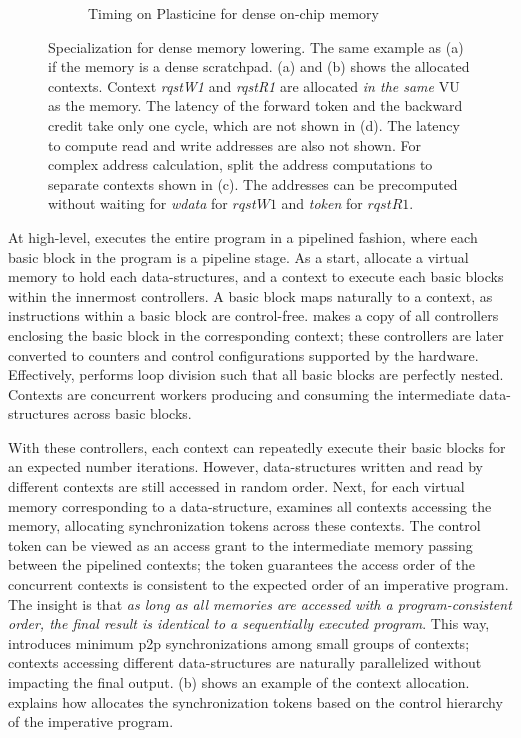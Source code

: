 \begin{figure}
\begin{subfigure}[b]{1\textwidth}
\caption{Timing on Plasticine for dense on-chip memory}
\end{subfigure}
\caption[Dense specialization]{
  Specialization for dense memory lowering.
  The same example as  (a) if the memory is a dense scratchpad.
  (a) and (b) shows the allocated contexts.
  Context \emph{rqstW1} and \emph{rqstR1} are allocated \emph{in the same} VU as the memory. The latency of 
  the forward token and the backward credit take only one cycle, which are not shown in (d).
  The latency to compute read and write addresses are also not shown.
  For complex address calculation, \name split the address computations to separate contexts shown
  in (c). The addresses can be precomputed without waiting for \emph{wdata} for $rqstW1$ and 
  \emph{token} for $rqstR1$.
}
\label{fig:densespecial}
\end{figure}

At high-level, \name executes the entire program in a pipelined fashion, where each basic block
in the program is a pipeline stage.
As a start, \name allocate a virtual memory to hold each data-structures, and 
a context to execute each basic blocks within the innermost controllers. 
A basic block maps naturally to a context, as instructions within a basic block are control-free. 
\name makes a copy of all controllers enclosing the basic block in the corresponding context;
these controllers are later converted to counters and control configurations supported by the
hardware. 
Effectively, \name performs loop division such that all basic blocks are perfectly nested.
Contexts are concurrent workers producing and consuming the intermediate data-structures across basic
blocks.

With these controllers, each context can repeatedly execute their basic blocks for an expected number iterations. 
However, data-structures written and read by different contexts are still accessed in random order.
Next, for each virtual memory corresponding to a data-structure, \name examines all contexts accessing the memory,
allocating synchronization tokens across these contexts.
The control token can be viewed as an access grant to the intermediate memory passing between 
the pipelined contexts; the token guarantees the access order of the concurrent contexts is consistent to
the expected order of an imperative program.
The insight is that \emph{as long as all memories are accessed with a program-consistent
order, the final result is identical to a sequentially executed program}.
This way, \name introduces minimum p2p synchronizations among small groups of contexts; contexts
accessing different data-structures are naturally parallelized without impacting the final output.
 (b) shows an example of the context allocation. 
 explains how \name allocates the synchronization tokens based on the control
hierarchy of the imperative program.

